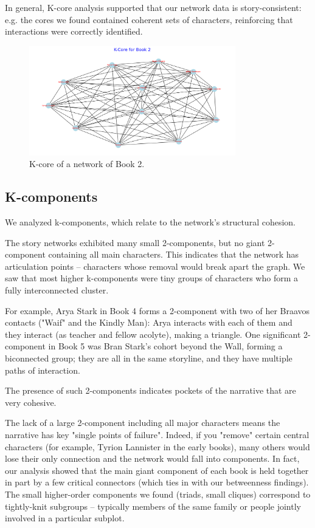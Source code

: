 \documentclass[12pt, a4paper]{article}
\begin{document}
In general, K-core analysis supported that our network data is story-consistent: e.g. the cores we found contained coherent sets of characters, reinforcing that interactions were correctly identified.
\begin{figure}[htbp]
      \centering
      \includegraphics[width=0.8\textwidth]{k-core-book2.png}
      \caption{K-core of a network of Book 2.}
      \label{fig:kcore}
\end{figure}

\subsection*{K-components}

We analyzed k-components, which relate to the network's structural cohesion.

The story networks exhibited many small 2-components, but no giant 2-component containing all main characters. This indicates that the network has articulation points – characters whose removal would break apart the graph. 
We saw that most higher k-components were tiny groups of characters who form a fully interconnected cluster. 

For example, Arya Stark in Book 4 forms a 2-component with two of her Braavos contacts ("Waif" and the Kindly Man): Arya interacts with each of them and they interact (as teacher and fellow acolyte), making a triangle. One significant 2-component in Book 5 was Bran Stark's cohort beyond the Wall, forming a biconnected group; they are all in the same storyline, and they have multiple paths of interaction. 

The presence of such 2-components indicates pockets of the narrative that are very cohesive. 
 
The lack of a large 2-component including all major characters means the narrative has key "single points of failure". Indeed, if you "remove" certain central characters (for example, Tyrion Lannister in the early books), many others would lose their only connection and the network would fall into components. In fact, our analysis showed that the main giant component of each book is held together in part by a few critical connectors (which ties in with our betweenness findings). The small higher-order components we found (triads, small cliques) correspond to tightly-knit subgroups – typically members of the same family or people jointly involved in a particular subplot.
\end{document}

